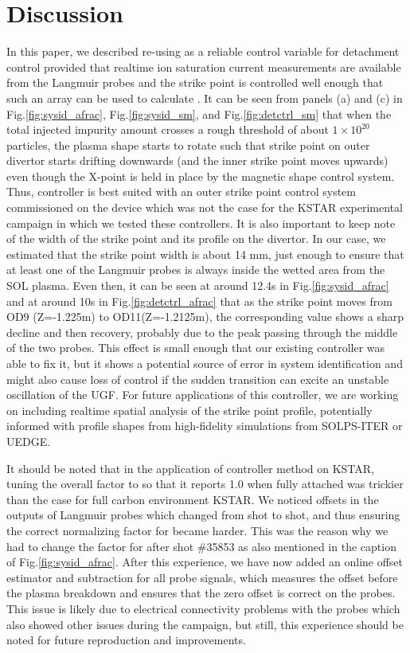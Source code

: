 \section{Discussion}
\label{sec:discussion}

In this paper, we described re-using \Afrac as a reliable control variable for detachment control provided that realtime ion saturation current measurements are available from the Langmuir probes and the strike point is controlled well enough that such an array can be used to calculate \Afrac.
It can be seen from panels (a) and (c) in Fig.\ref{fig:sysid_afrac}, Fig.\ref{fig:sysid_sm}, and Fig.\ref{fig:detctrl_sm} that when the total injected impurity amount crosses a rough threshold of about $1\times10^{20}$ particles, the plasma shape starts to rotate such that strike point on outer divertor starts drifting downwards (and the inner strike point moves upwards) even though the X-point is held in place by the magnetic shape control system.
Thus, \Afrac controller is best suited with an outer strike point control system commissioned on the device which was not the case for the KSTAR experimental campaign in which we tested these controllers.
It is also important to keep note of the width of the strike point and its profile on the divertor.
In our case, we estimated that the strike point width is about 14 mm, just enough to ensure that at least one of the Langmuir probes is always inside the wetted area from the \ac{SOL} plasma.
Even then, it can be seen at around 12.4s in Fig.\ref{fig:sysid_afrac} and at around 10s in Fig.\ref{fig:detctrl_afrac} that as the strike point moves from OD9 (Z=-1.225m) to OD11(Z=-1.2125m), the corresponding \Afrac value shows a sharp decline and then recovery, probably due to the peak passing through the middle of the two probes.
This effect is small enough that our existing controller was able to fix it, but it shows a potential source of error in system identification and might also cause loss of control if the sudden transition can excite an unstable oscillation of the \ac{UGF}.
For future applications of this controller, we are working on including realtime spatial analysis of the strike point profile, potentially informed with profile shapes from high-fidelity simulations from SOLPS-ITER or UEDGE.

It should be noted that in the application of \Afrac controller method on KSTAR, tuning the overall factor to \Afrac so that it reports 1.0 when fully attached was trickier than the case for full carbon environment KSTAR\cite{Eldon_2022_PPCF}.
We noticed offsets in the outputs of Langmuir probes which changed from shot to shot, and thus ensuring the correct normalizing factor for \Afrac became harder.
This was the reason why we had to change the factor for \Afrac after shot \#35853 as also mentioned in the caption of Fig.\ref{fig:sysid_afrac}.
After this experience, we have now added an online offset estimator and subtraction for all probe signals, which measures the offset before the plasma breakdown and ensures that the zero offset is correct on the probes.
This issue is likely due to electrical connectivity problems with the probes which also showed other issues during the campaign, but still, this experience should be noted for future reproduction and improvements.

